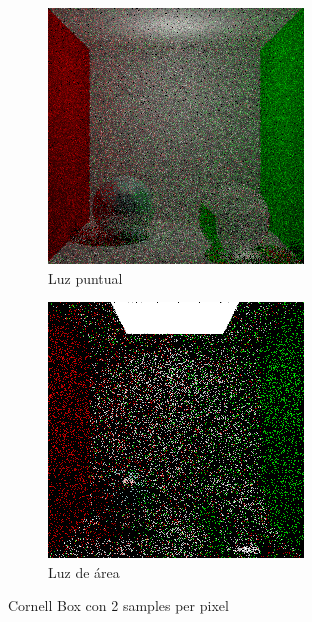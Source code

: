 \documentclass{article}
\begin{document}
\begin{figure}[H]
\begin{subfigure}[h]{0.4\linewidth}
\includegraphics[width=\linewidth]{imgs/cosine_box2.png}
\caption{Luz puntual}
\end{subfigure}
\hfill
\begin{subfigure}[h]{0.4\linewidth}
\includegraphics[width=\linewidth]{imgs/area_box2.png}
\caption{Luz de área}
\end{subfigure}%
\caption{Cornell Box con 2 samples per pixel}
\end{figure}
\end{document}
